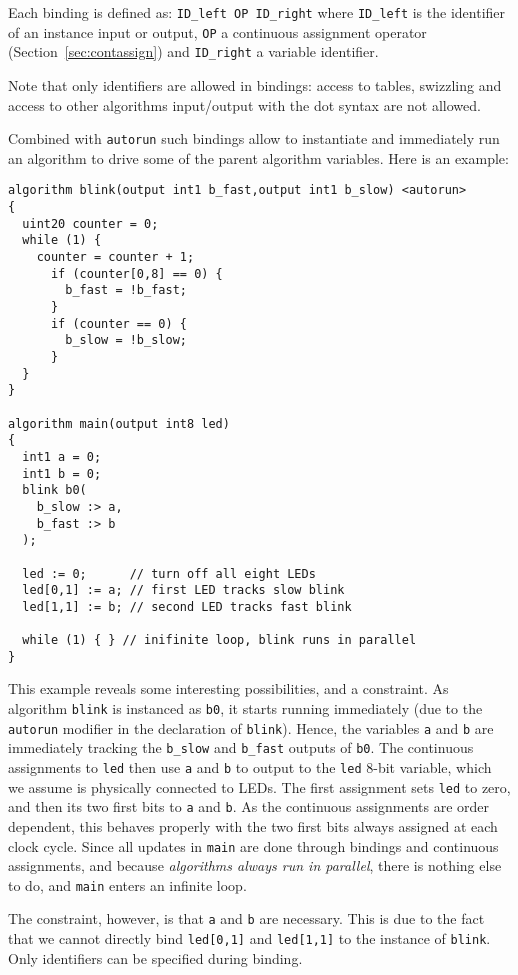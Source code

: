 \documentclass[a4]{article}
\begin{document}
Each binding is defined as:
\texttt{ID\_left OP ID\_right} 
where \texttt{ID\_left}
is the identifier of an instance input or output, \texttt{OP} a continuous
assignment operator (Section~\ref{sec:contassign}) and \texttt{ID\_right} a variable identifier.

Note that only identifiers are allowed in bindings: access to tables, swizzling and access to other algorithms input/output with the dot syntax are not allowed.

Combined with \texttt{autorun} such bindings allow to instantiate and immediately run an algorithm to drive some of the parent algorithm variables. 
Here is an example:
%
\begin{verbatim}
algorithm blink(output int1 b_fast,output int1 b_slow) <autorun>
{
  uint20 counter = 0;
  while (1) {
    counter = counter + 1;
      if (counter[0,8] == 0) {
        b_fast = !b_fast;
      }
      if (counter == 0) {
        b_slow = !b_slow;
      }
  }
}

algorithm main(output int8 led)
{
  int1 a = 0;
  int1 b = 0;
  blink b0(
    b_slow :> a,
    b_fast :> b
  );

  led := 0;      // turn off all eight LEDs
  led[0,1] := a; // first LED tracks slow blink
  led[1,1] := b; // second LED tracks fast blink

  while (1) { } // inifinite loop, blink runs in parallel
}
\end{verbatim}
%
This example reveals some interesting possibilities, and a constraint.
As algorithm \texttt{blink} is instanced as \texttt{b0}, it starts running immediately (due to the \texttt{autorun} modifier in the declaration of \texttt{blink}). Hence, the variables \texttt{a} and \texttt{b}
are immediately tracking the \texttt{b\_slow} and \texttt{b\_fast} outputs of \texttt{b0}. The continuous assignments to \texttt{led} then use \texttt{a} and \texttt{b} to output to the \texttt{led} 8-bit variable, which we assume is physically connected to LEDs. The first assignment sets \texttt{led} to zero, and then its two first bits to \texttt{a} and \texttt{b}. As the continuous assignments are order dependent, this behaves properly with the two first bits always assigned at each clock cycle. Since all updates in \texttt{main} are done through bindings and continuous assignments, and because \textit{algorithms always run in parallel}, there is nothing else to do, and \texttt{main} enters an infinite loop.

The constraint, however, is that \texttt{a} and \texttt{b} are necessary. This is due to the fact that we cannot directly bind \texttt{led[0,1]} and \texttt{led[1,1]} to the instance of \texttt{blink}. Only identifiers can be specified during binding.
\end{document}
